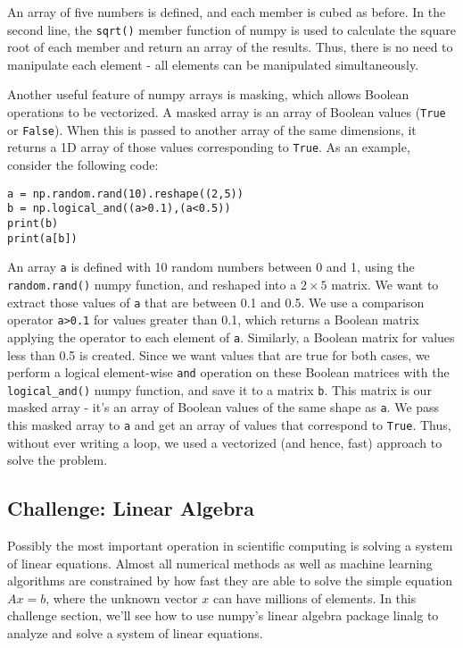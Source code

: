 \documentclass[12pt]{article}
\newcommand{\code}{\texttt}
\begin{document}
An array of five numbers is defined, and each member is cubed as before. In the second line, the \code{sqrt()} member function of numpy is used to calculate the square root of each member and return an array of the results. Thus, there is no need to manipulate each element - all elements can be manipulated simultaneously. 

Another useful feature of numpy arrays is masking, which allows Boolean operations to be vectorized. A masked array is an array of Boolean values (\code{True} or \code{False}). When this is passed to another array of the same dimensions, it returns a 1D array of those values corresponding to \code{True}. As an example, consider the following code:

\begin{lstlisting}[frame=single] 
a = np.random.rand(10).reshape((2,5))
b = np.logical_and((a>0.1),(a<0.5))
print(b)
print(a[b])
\end{lstlisting}

An array \code{a} is defined with 10 random numbers between 0 and 1, using the \code{random.rand()} numpy function, and reshaped into a $2\times5$ matrix. We want to extract those values of \code{a} that are between 0.1 and 0.5. We use a comparison operator \code{a>0.1} for values greater than 0.1, which returns a Boolean matrix applying the operator to each element of \code{a}. Similarly, a Boolean matrix for values less than 0.5 is created. Since we want values that are true for both cases, we perform a logical element-wise \code{and} operation on these Boolean matrices with the \code{logical\_and()} numpy function, and save it to a matrix \code{b}. This matrix is our masked array - it's an array of Boolean values of the same shape as \code{a}. We pass this masked array to \code{a} and get an array of values that correspond to \code{True}. Thus, without ever writing a loop, we used a vectorized (and hence, fast) approach to solve the problem.

\subsection{Challenge: Linear Algebra}
Possibly the most important operation in scientific computing is solving a system of linear equations. Almost all numerical methods as well as machine learning algorithms are constrained by how fast they are able to solve the simple equation $Ax=b$, where the unknown vector $x$ can have millions of elements. In this challenge section, we'll see how to use numpy's linear algebra package linalg to analyze and solve a system of linear equations. 
\end{document}
